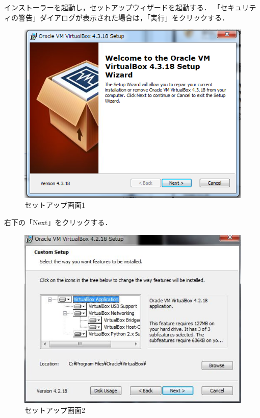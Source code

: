 インストーラーを起動し，セットアップウィザードを起動する．
「セキュリティの警告」ダイアログが表示された場合は，「実行」をクリックする．


\begin{figure}[H]
\centering
\includegraphics[width=13cm]{VBsetup.png}
\caption{セットアップ画面1}\label{サンプル図}
\end{figure}

右下の「Next」をクリックする．


\begin{figure}[H]
\centering
\includegraphics[width=13cm]{VBsetup2.jpg}
\caption{セットアップ画面2}\label{サンプル図}
\end{figure}

